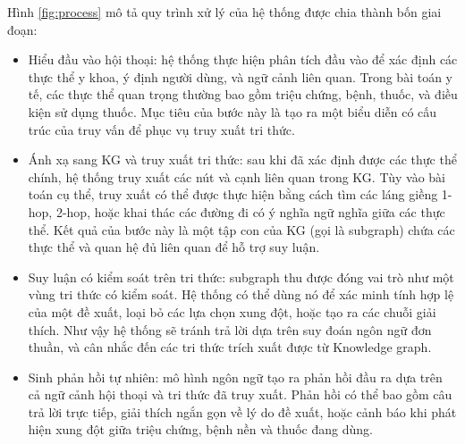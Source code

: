 \documentclass[conference]{IEEEtran}
\begin{document}
Hình \ref{fig:process} mô tả quy trình xử lý của hệ thống được chia thành bốn giai đoạn:
\begin{itemize}
    \item Hiểu đầu vào hội thoại: hệ thống thực hiện phân tích đầu vào để xác định các thực thể y khoa, ý định người dùng, và ngữ cảnh liên quan. Trong bài toán y tế, các thực thể quan trọng thường bao gồm triệu chứng, bệnh, thuốc, và điều kiện sử dụng thuốc. Mục tiêu của bước này là tạo ra một biểu diễn có cấu trúc của truy vấn để phục vụ truy xuất tri thức.
    \item Ánh xạ sang KG và truy xuất tri thức: sau khi đã xác định được các thực thể chính, hệ thống truy xuất các nút và cạnh liên quan trong KG. Tùy vào bài toán cụ thể, truy xuất có thể được thực hiện bằng cách tìm các láng giềng 1-hop, 2-hop, hoặc khai thác các đường đi có ý nghĩa ngữ nghĩa giữa các thực thể. Kết quả của bước này là một tập con của KG (gọi là subgraph) chứa các thực thể và quan hệ đủ liên quan để hỗ trợ suy luận.
    \item Suy luận có kiểm soát trên tri thức: subgraph thu được đóng vai trò như một vùng tri thức có kiểm soát. Hệ thống có thể dùng nó để xác minh tính hợp lệ của một đề xuất, loại bỏ các lựa chọn xung đột, hoặc tạo ra các chuỗi giải thích. Như vậy hệ thống sẽ tránh trả lời dựa trên suy đoán ngôn ngữ đơn thuần, và cân nhắc đến các tri thức trích xuất được từ Knowledge graph.
    \item Sinh phản hồi tự nhiên: mô hình ngôn ngữ tạo ra phản hồi đầu ra dựa trên cả ngữ cảnh hội thoại và tri thức đã truy xuất. Phản hồi có thể bao gồm câu trả lời trực tiếp, giải thích ngắn gọn về lý do đề xuất, hoặc cảnh báo khi phát hiện xung đột giữa triệu chứng, bệnh nền và thuốc đang dùng.
\end{itemize}
\end{document}

